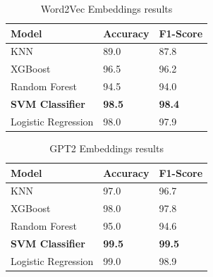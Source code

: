 \begin{table}[hbt!]
\begin{threeparttable}
\caption{Word2Vec Embeddings results}
\label{word2vec_embeddings_results}
\begin{tabular}{lll}
\toprule
\headrow Model & Accuracy & F1-Score\\
\midrule
KNN                 &       89.0 &       87.8 \\
XGBoost             &       96.5 &       96.2 \\
Random Forest       &       94.5 &       94.0 \\
\textbf{SVM Classifier}      &       \textbf{98.5} &       \textbf{98.4} \\
Logistic Regression &       98.0 &       97.9 \\
\bottomrule
\end{tabular}
\end{threeparttable}
\end{table}

\begin{table}[hbt!]
\begin{threeparttable}
\caption{GPT2 Embeddings results}
\label{bert_embeddings_results}
\begin{tabular}{lll}
\toprule
\headrow Model & Accuracy & F1-Score\\
\midrule
KNN & 97.0 & 96.7\\ 
XGBoost & 98.0 & 97.8\\ 
Random Forest & 95.0 & 94.6\\ 
\textbf{SVM Classifier} & \textbf{99.5} & \textbf{99.5}\\ 
Logistic Regression & 99.0 & 98.9\\ 
\bottomrule
\end{tabular}
\end{threeparttable}
\end{table}

